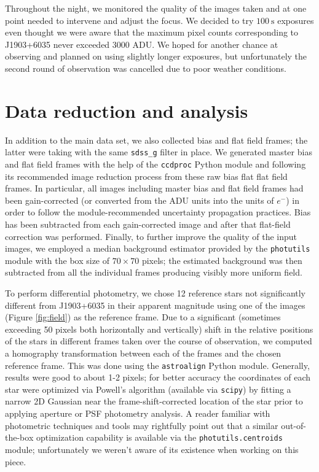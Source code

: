 \documentclass{aastex631}
\begin{document}
Throughout the night, we monitored the quality of the images taken and
at one point needed to intervene and adjust the focus. We decided to
try $\SI{100}{\second}$ exposures even thought we were aware that the
maximum pixel counts corresponding to J1903+6035 never exceeded 3000
ADU. We hoped for another chance at observing and planned on using
slightly longer exposures, but unfortunately the second round of
observation was cancelled due to poor weather conditions.

\section{Data reduction and analysis}
\label{sec:ana}
In addition to the main data set, we also collected bias and flat
field frames; the latter were taking with the same \texttt{sdss\_g}
filter in place. We generated master bias and flat field frames with
the help of the \texttt{ccdproc} Python module and following its
recommended image reduction process from these raw bias flat flat
field frames. In particular, all images including master bias and flat
field frames had been gain-corrected (or converted from the ADU units
into the units of $e^-$) in order to follow the module-recommended
uncertainty propagation practices. Bias has been subtracted from each
gain-corrected image and after that flat-field correction was
performed. Finally, to further improve the quality of the input
images, we employed a median background estimator provided by the
\texttt{photutils} module with the box size of $70\times 70$ pixels;
the estimated background was then subtracted from all the individual
frames producing visibly more uniform field.

To perform differential photometry, we chose 12 reference stars not
significantly different from J1903+6035 in their apparent magnitude
using one of the images (Figure \ref{fig:field}) as the reference
frame. Due to a significant (sometimes exceeding 50 pixels both
horizontally and vertically) shift in the relative positions of the
stars in different frames taken over the course of observation, we
computed a homography transformation between each of the frames and
the chosen reference frame. This was done using the
\texttt{astroalign} Python module. Generally, results were good to
about 1-2 pixels; for better accuracy the coordinates of each star
were optimized via Powell's algorithm (available via \texttt{scipy})
by fitting a narrow 2D Gaussian near the frame-shift-corrected
location of the star prior to applying aperture or PSF photometry
analysis. A reader familiar with photometric techniques and tools may
rightfully point out that a similar out-of-the-box optimization
capability is available via the \texttt{photutils.centroids} module;
unfortunately we weren't aware of its existence when working on this
piece.
\end{document}
